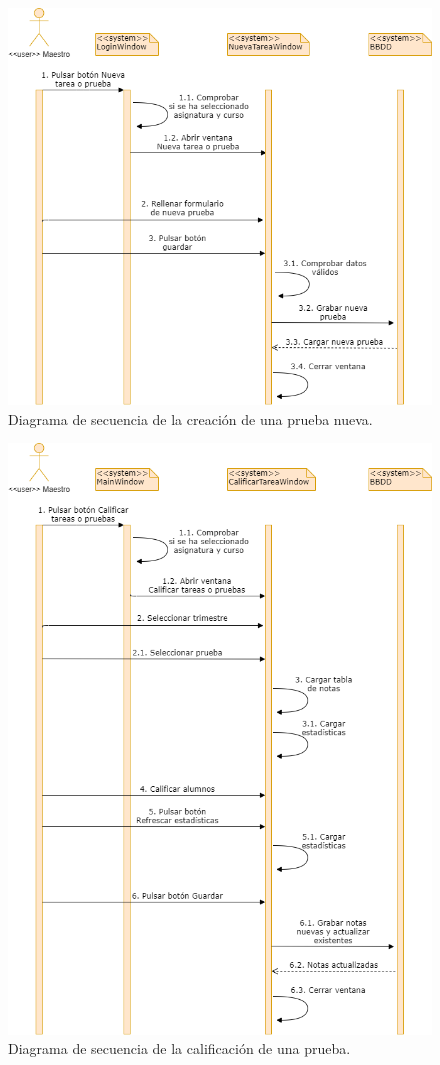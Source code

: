 \begin{figure}[H]
\centering\includegraphics[width=0.75\linewidth]{figs/dia_nuevaprueba.png}
\caption{Diagrama de secuencia de la creación de una prueba nueva.}
\label{Fig:dia_nuevaprueba}
\end{figure}

\begin{figure}[H]
\centering\includegraphics[width=1\linewidth]{figs/dia_calificarprueba.png}
\caption{Diagrama de secuencia de la calificación de una prueba.}
\label{Fig:dia_calificarprueba}
\end{figure}

